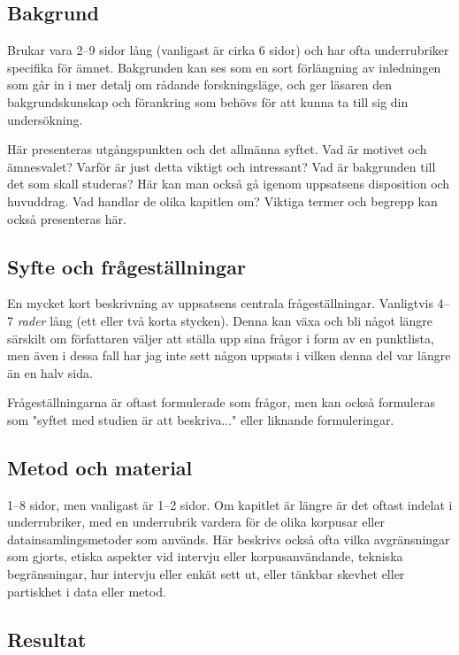 \subsection{Bakgrund}
\label{rubrik.bakgrund}

Brukar vara 2--9 sidor lång (vanligast är cirka 6 sidor) och har ofta
underrubriker specifika för ämnet. Bakgrunden kan ses som en sort förlängning
av inledningen som går in i mer detalj om rådande forskningsläge, och ger
läsaren den bakgrundskunskap och förankring som behövs för att kunna ta till
sig din undersökning.

Här presenteras utgångspunkten och det allmänna syftet. Vad är motivet och
ämnesvalet? Varför är just detta viktigt och intressant? Vad är bakgrunden till
det som skall studeras? Här kan man också gå igenom uppsatsens disposition och
huvuddrag. Vad handlar de olika kapitlen om? Viktiga termer och begrepp kan
också presenteras här.


\subsection{Syfte och frågeställningar}
\label{rubrik.syfte}

En mycket kort beskrivning av uppsatsens centrala frågeställningar. Vanligtvis
4–7 \emph{rader} lång (ett eller två korta stycken). Denna kan växa och bli
något längre särskilt om författaren väljer att ställa upp sina frågor i form
av en punktlista, men även i dessa fall har jag inte sett någon uppsats i
vilken denna del var längre än en halv sida.

Frågeställningarna är oftast formulerade som frågor, men kan också formuleras
som "syftet med studien är att beskriva..." eller liknande formuleringar.


\subsection{Metod och material}
\label{rubrik.metod}

1--8 sidor, men vanligast är 1--2 sidor. Om kapitlet är längre är det oftast
indelat i underrubriker, med en underrubrik vardera för de olika korpusar eller
datainsamlingsmetoder som används. Här beskrivs också ofta vilka avgränsningar
som gjorts, etiska aspekter vid intervju eller korpusanvändande, tekniska
begränsningar, hur intervju eller enkät sett ut, eller tänkbar skevhet eller
partiskhet i data eller metod.


\subsection{Resultat}
\label{rubrik.resultat}

